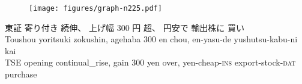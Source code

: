 \documentclass[varwidth]{standalone}
\begin{document}
\begin{figure}
    \centering
    \texttt{[image: figures/graph-n225.pdf]}
\end{figure}
\begin{exe}
    \ex\glll%
    {東証} {寄り付き} {続伸、} {上げ幅} {300} {円} {超、} {円安で} {輸出株に} {買い}\\
    {Toushou} {yoritsuki} {zokushin,} {agehaba} {300} {en} {chou,} {en-yasu-de} {yushutsu-kabu-ni} {kai}\\
    {TSE} {opening} {continual\_rise,} {gain} {300} {yen} {over,} {yen-cheap-\textsc{ins}} {export-stock-\textsc{dat}} {purchase}\\
\end{exe}
\end{document}
